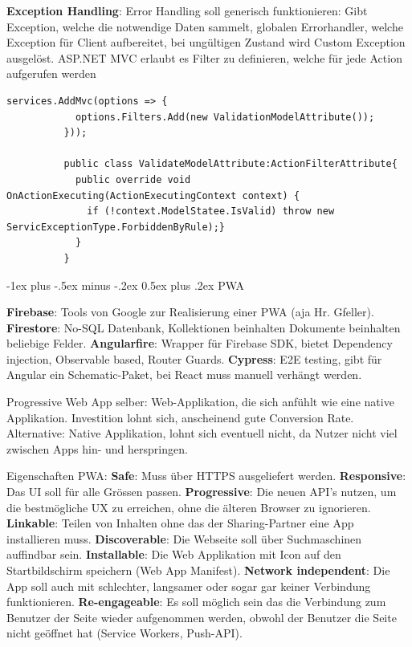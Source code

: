 \documentclass[10pt,landscape]{article}
\makeatletter
\renewcommand{\section}{\@startsection{section}{1}{0mm}%
{-1ex plus -.5ex minus -.2ex}%
{0.5ex plus .2ex}%
{\normalfont\large\bfseries}}
\makeatother
\begin{document}
\begin{multicols}{2}
        \textbf{Exception Handling}: Error Handling soll generisch funktionieren: Gibt Exception, welche die notwendige Daten sammelt, globalen Errorhandler, welche Exception für Client aufbereitet, bei ungültigen Zustand wird Custom Exception ausgelöst.
        ASP.NET MVC erlaubt es Filter zu definieren, welche für jede Action aufgerufen werden 
        \begin{lstlisting}[style=CSharp]
          services.AddMvc(options => {
            options.Filters.Add(new ValidationModelAttribute());
          }));

          public class ValidateModelAttribute:ActionFilterAttribute{
            public override void OnActionExecuting(ActionExecutingContext context) {
              if (!context.ModelStatee.IsValid) throw new ServicExceptionType.ForbiddenByRule);}
            }
          }
        \end{lstlisting}
        
      

        \section{PWA}

        \textbf{Firebase}: Tools von Google zur Realisierung einer PWA (aja Hr. Gfeller).
        \textbf{Firestore}: No-SQL Datenbank, Kollektionen beinhalten Dokumente beinhalten beliebige Felder.
        \textbf{Angularfire}: Wrapper für Firebase SDK, bietet Dependency injection, Observable based, Router Guards.
        \textbf{Cypress}: E2E testing, gibt für Angular ein Schematic-Paket, bei React muss manuell verhängt werden.

        Progressive Web App selber: Web-Applikation, die sich anfühlt wie eine native Applikation.
        Investition lohnt sich, anscheinend gute Conversion Rate.
        Alternative: Native Applikation, lohnt sich eventuell nicht, da Nutzer nicht viel zwischen Apps hin- und herspringen.

        Eigenschaften PWA: \textbf{Safe}: Muss über HTTPS ausgeliefert werden.
        \textbf{Responsive}: Das UI soll für alle Grössen passen.
        \textbf{Progressive}: Die neuen API’s nutzen, um die bestmögliche UX zu erreichen, ohne die älteren Browser zu ignorieren.
        \textbf{Linkable}: Teilen von Inhalten ohne das der Sharing-Partner eine App installieren muss.
        \textbf{Discoverable}: Die Webseite soll über Suchmaschinen auffindbar sein.
        \textbf{Installable}: Die Web Applikation mit Icon auf den Startbildschirm speichern (Web App Manifest).
        \textbf{Network independent}: Die App soll auch mit schlechter, langsamer oder sogar gar keiner Verbindung funktionieren.
        \textbf{Re-engageable}: Es soll möglich sein das die Verbindung zum Benutzer der Seite wieder aufgenommen werden, obwohl der Benutzer die Seite nicht geöffnet hat (Service Workers, Push-API).


\end{multicols}
\end{document}
